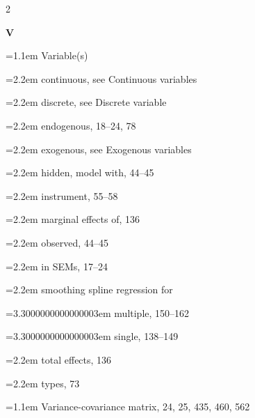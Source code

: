 \begin{multicols}{2}
\par{}\medskip\noindent\textbf{V}\par\nobreak\smallskip\nobreak
\noindent\hangindent=1.1em Variable(s)\par
\noindent\hangindent=2.2em \hspace*{1.1em}continuous, see Continuous variables\par
\noindent\hangindent=2.2em \hspace*{1.1em}discrete, see Discrete variable\par
\noindent\hangindent=2.2em \hspace*{1.1em}endogenous, 18--24, 78\par
\noindent\hangindent=2.2em \hspace*{1.1em}exogenous, see Exogenous variables\par
\noindent\hangindent=2.2em \hspace*{1.1em}hidden, model with, 44--45\par
\noindent\hangindent=2.2em \hspace*{1.1em}instrument, 55--58\par
\noindent\hangindent=2.2em \hspace*{1.1em}marginal effects of, 136\par
\noindent\hangindent=2.2em \hspace*{1.1em}observed, 44--45\par
\noindent\hangindent=2.2em \hspace*{1.1em}in SEMs, 17--24\par
\noindent\hangindent=2.2em \hspace*{1.1em}smoothing spline regression for\par
\noindent\hangindent=3.3000000000000003em \hspace*{2.2em}multiple, 150--162\par
\noindent\hangindent=3.3000000000000003em \hspace*{2.2em}single, 138--149\par
\noindent\hangindent=2.2em \hspace*{1.1em}total effects, 136\par
\noindent\hangindent=2.2em \hspace*{1.1em}types, 73\par
\noindent\hangindent=1.1em Variance-covariance matrix, 24, 25, 435, 460, 562\par

\end{multicols}
